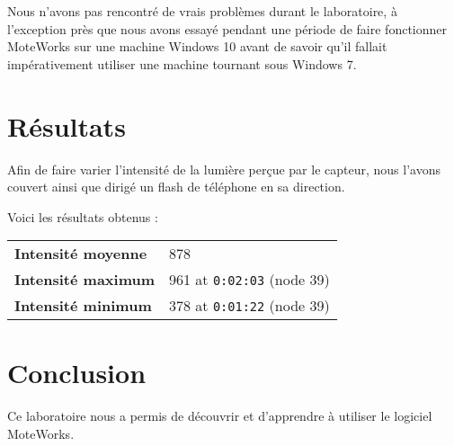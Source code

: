 Nous n'avons pas rencontré de vrais problèmes durant le laboratoire, à l'exception près que nous avons essayé pendant une période de faire fonctionner MoteWorks sur une machine Windows 10 avant de savoir qu'il fallait impérativement utiliser une machine tournant sous Windows 7.

\section*{Résultats}

Afin de faire varier l'intensité de la lumière perçue par le capteur, nous l'avons couvert ainsi que dirigé un flash de téléphone en sa direction.

Voici les résultats obtenus :

\begin{center}

\begin{tabular}{ll}
	\hline
	\textbf{Intensité moyenne} & 878 \\
	\textbf{Intensité maximum} & 961 at \texttt{0:02:03} (node 39) \\
	\textbf{Intensité minimum} & 378 at \texttt{0:01:22} (node 39) \\
	\hline
\end{tabular}

\end{center}

\section*{Conclusion}

Ce laboratoire nous a permis de découvrir et d'apprendre à utiliser le logiciel MoteWorks.

